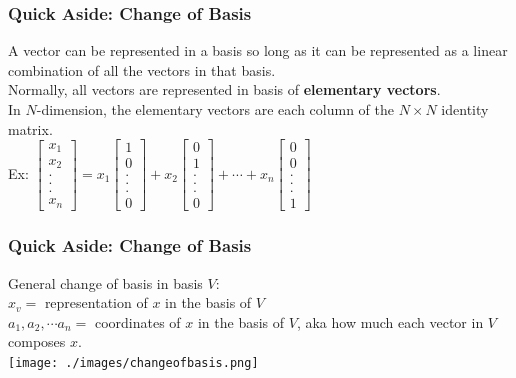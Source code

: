 \documentclass{beamer}
\begin{document}
\begin{frame}
\frametitle{Quick Aside: Change of Basis}
A vector can be represented in a basis so long as it can be represented as a linear combination of all the vectors in that basis. \\
Normally, all vectors are represented in basis of \textbf{elementary vectors}.  \\
In $N$-dimension, the elementary vectors are each column of the $N \times N$ identity matrix. \\
Ex: $\begin{bmatrix}x_1 \\ x_2 \\ . \\ . \\ . \\ x_n\end{bmatrix} = x_1 \begin{bmatrix}1 \\ 0 \\ . \\ . \\ . \\ 0\end{bmatrix} +x_2\begin{bmatrix}0\\ 1 \\ . \\ . \\ . \\ 0\end{bmatrix} + \cdots + x_n\begin{bmatrix}0\\ 0 \\ . \\ . \\ . \\ 1\end{bmatrix}$



\end{frame}

\begin{frame}
\frametitle{Quick Aside: Change of Basis}
General change of basis in basis $V$: \\
$x_v = $ representation of $x$ in the basis of $V$ \\
$a_1, a_2, \cdots a_n = $ coordinates of $x$ in the basis of $V$, aka how much each vector in $V$ composes $x$. \\
\texttt{[image: ./images/changeofbasis.png]}

\end{frame}
\end{document}
